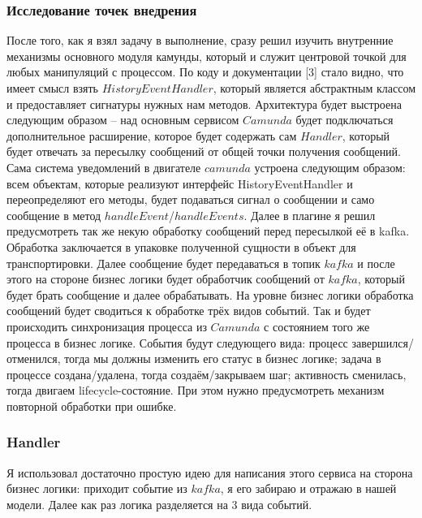 \subsubsection{Исследование точек внедрения}
После того, как я взял задачу в выполнение, сразу решил изучить внутренние механизмы основного модуля камунды,
который и служит центровой точкой для любых манипуляций с процессом. По коду и документации [3] стало видно,
что имеет смысл взять $HistoryEventHandler$, который является абстрактным классом и предоставляет сигнатуры нужных нам методов.
Архитектура будет выстроена следующим образом -- над основным сервисом $Camunda$ будет подключаться дополнительное расширение,
которое будет содержать сам $Handler$, который будет отвечать за пересылку сообщений от общей точки получения сообщений. 
Сама система уведомлений в двигателе $camunda$ устроена следующим образом: 
всем объектам, которые реализуют интерфейс HistoryEventHandler и переопределяют его методы,
будет подаваться сигнал о сообщении и само сообщение в метод $handleEvent$/$handleEvents$.
Далее в плагине я решил предусмотреть так же некую обработку сообщений перед пересылкой её в kafka. 
Обработка заключается в упаковке полученной сущности в объект для транспортировки. Далее сообщение будет передаваться 
в топик $kafka$ и после этого на стороне бизнес логики будет обработчик сообщений от $kafka$, 
который будет брать сообщение и далее обрабатывать. На уровне бизнес логики обработка сообщений 
будет сводиться к обработке трёх видов событий. Так и будет происходить синхронизация процесса из 
$Camunda$ с состоянием того же процесса в бизнес логике. События будут следующего вида: процесс завершился/отменился, тогда мы должны изменить его статус в бизнес логике; 
задача в процессе создана/удалена, тогда создаём/закрываем шаг; активность сменилась, тогда двигаем lifecycle-состояние. При этом нужно предусмотреть механизм повторной обработки при ошибке.

\subsubsection{Handler}

Я использовал достаточно простую идею для написания этого сервиса на сторона бизнес логики: приходит событие из $kafka$, я его забираю и отражаю в нашей модели. Далее как раз логика разделяется на 3 вида событий.

